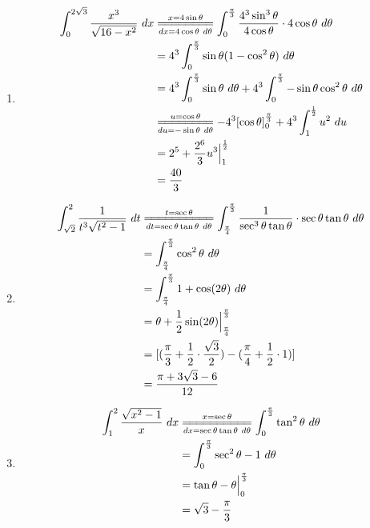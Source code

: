 \documentclass{article}
\begin{document}
\begin{enumerate}[label={\bf{}\arabic*}.]
\item%
	\begin{align*}
	\int_0^{2\sqrt{3}}\frac{x^3}{\sqrt{16-x^2}}\ dx&\overset{x=4\sin\theta}{\underset{dx=4\cos\theta\ d\theta}{=\joinrel=\joinrel=\joinrel=\joinrel=\joinrel=\joinrel=\joinrel=}}\int_0^\frac{\pi}{3}\frac{4^3\sin^3\theta}{4\cos\theta}\cdot4\cos\theta\ d\theta\\
	&=4^3\int_0^\frac{\pi}{3}\sin\theta(1-\cos^2\theta)\ d\theta\\
	&=4^3\int_0^\frac{\pi}{3}\sin\theta\ d\theta+4^3\int_0^\frac{\pi}{3}-\sin\theta\cos^2\theta\ d\theta\\
	&\overset{u=\cos\theta}{\underset{du=-\sin\theta\ d\theta}{=\joinrel=\joinrel=\joinrel=\joinrel=\joinrel=\joinrel=\joinrel=}}-4^3[\cos\theta]_0^\frac{\pi}{3}+4^3\int_1^\frac{1}{2}u^2\ du\\
	&=2^5+\frac{2^6}{3}u^3\Big|_1^\frac{1}{2}\\
	&=\frac{40}{3}
	\end{align*}

\item%
	\begin{align*}
    \int_{\sqrt{2}}^2\frac{1}{t^3\sqrt{t^2-1}}\ dt &\overset{t=\sec\theta}{\underset{dt=\sec\theta\tan\theta\ d\theta}{=\joinrel=\joinrel=\joinrel=\joinrel=\joinrel=\joinrel=\joinrel=\joinrel=\joinrel=}}\int_\frac{\pi}{4}^\frac{\pi}{3}\frac{1}{\sec^3\theta\tan\theta}\cdot\sec\theta\tan\theta\ d\theta\\
	&=\int_\frac{\pi}{4}^\frac{\pi}{3}\cos^2\theta\ d\theta\\
	&=\int_\frac{\pi}{4}^\frac{\pi}{3}1+\cos(2\theta)\ d\theta\\
	&=\theta+\frac{1}{2}\sin(2\theta)\Big|_\frac{\pi}{4}^\frac{\pi}{3}\\
	&=[(\frac{\pi}{3}+\frac{1}{2}\cdot\frac{\sqrt{3}}{2})-(\frac{\pi}{4}+\frac{1}{2}\cdot1)]\\
	&=\frac{\pi+3\sqrt{3}-6}{12}
	\end{align*}

\item%
	\begin{align*}
	\int_1^2\frac{\sqrt{x^2-1}}{x}\ dx&\overset{x=\sec\theta}{\underset{dx=\sec\theta\tan\theta\ d\theta}{=\joinrel=\joinrel=\joinrel=\joinrel=\joinrel=\joinrel=\joinrel=\joinrel=\joinrel=}}\int_0^\frac{\pi}{3}\tan^2\theta\ d\theta\\
	&=\int_0^\frac{\pi}{3}\sec^2\theta-1\ d\theta\\
	&=\tan\theta-\theta\Big|_0^\frac{\pi}{3}\\
	&=\sqrt{3}-\frac{\pi}{3}
	\end{align*}


\end{enumerate}
\end{document}
